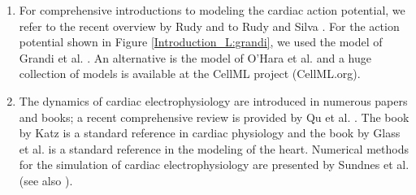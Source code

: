 \begin{enumerate}
\item For comprehensive introductions to modeling the cardiac action potential, we refer to the recent overview by Rudy \cite{Rudy2012} and to Rudy and Silva \cite{Rudy2006}.  For the action potential shown in Figure \ref{Introduction_L:grandi}, we used the model of Grandi et al. \cite{Grandi2010B}. An alternative is the model of O'Hara et al. \cite{Ohara2011} and a huge collection of models is available at the CellML project (CellML.org).
\item The dynamics of cardiac electrophysiology are introduced in numerous papers and books; a recent comprehensive review is provided by Qu et al. \cite{Qu2014}.  The book by Katz \cite{Katz2010}
is a standard reference in cardiac physiology and the book by Glass et al. \cite{Glass2012} is a standard reference in the modeling of the heart. Numerical methods for the simulation of cardiac electrophysiology are presented by Sundnes et al. \cite{Sundnes2007} (see also \cite{Pullan2005, Franzone2014}).



\end{enumerate}









